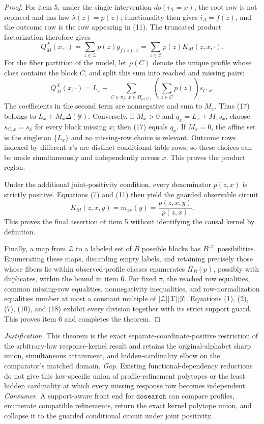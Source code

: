 \documentclass{article}
\begin{document}
\begin{proof}
For item 5, under the single intervention \(do(i_X=x)\), the root row is
not replaced and has law \(\lambda(z)=p(z)\); functionality then gives
\(i_A=f(z)\), and the outcome row is the row appearing in (11).  The
truncated product factorization therefore gives
\[
 Q_M^X(x,\cdot)
 =\sum_{z\in\mathcal Z}p(z)g_{f(z),x}
 =\sum_{z\in\mathcal Z}p(z)K_M(z,x,\cdot).
 \tag{16}
\]
For the fiber partition of the model, let \(\rho(C)\) denote the unique
profile whose class contains the block \(C\), and split this sum into
reached and missing pairs:
\[
 Q_M^X(x,\cdot)
 =L_x+
 \sum_{C\in\pi_f:\,x\in H_{\rho(C)}}
 \left(\sum_{z\in C}p(z)\right)s_{C,x}.
 \tag{17}
\]
The coefficients in the second term are nonnegative and sum to \(M_x\).
Thus (17) belongs to \(L_x+M_x\Delta(\mathcal Y)\).  Conversely, if
\(M_x>0\) and \(q_x=L_x+M_xs_x\), choose
\(s_{C,x}=s_x\) for every block missing \(x\); then (17) equals
\(q_x\).  If \(M_x=0\), the affine set is the singleton \(\{L_x\}\)
and no missing-row choice is relevant.  Outcome rows indexed by different
\(x\)'s are distinct conditional-table rows, so these choices can be made
simultaneously and independently across \(x\).  This proves the product
region.

Under the additional joint-positivity condition, every denominator
\(p(z,x)\) is strictly positive.  Equations (7) and (11) then yield the
guarded observable circuit
\[
 K_M(z,x,y)=m_{zx}(y)=\frac{p(z,x,y)}{p(z,x)}.
 \tag{18}
\]
This proves the final assertion of item 5 without identifying the causal
kernel by definition.

Finally, a map from \(\mathcal Z\) to a labeled set of \(B\) possible
blocks has \(B^{|\mathcal Z|}\) possibilities.  Enumerating these maps,
discarding empty labels, and retaining precisely those whose fibers lie
within observed-profile classes enumerates \(\Pi_B(p)\), possibly with
duplicates, within the bound in item 6.  For fixed \(\pi\), the reached
row equalities, common missing-row equalities, nonnegativity inequalities,
and row-normalization equalities number at most a constant multiple of
\(|\mathcal Z||\mathcal X||\mathcal Y|\).  Equations (1), (2), (7),
(10), and (18) exhibit every division together with its strict support
guard.  This proves item 6 and completes the theorem.
\end{proof}
\par\smallskip\noindent \textit{Justification.} This theorem is the exact separate-coordinate-positive restriction of the arbitrary-law response-kernel result and retains the original-alphabet sharp union, simultaneous attainment, and hidden-cardinality elbow on the comparator's matched domain. \textit{Gap.} Existing functional-dependency reductions do not give this law-specific union of profile-refinement polytopes or the least hidden cardinality at which every missing response row becomes independent. \textit{Consumer.} A support-aware front end for \(\texttt{dosearch}\) can compare profiles, enumerate compatible refinements, return the exact kernel polytope union, and collapse it to the guarded conditional circuit under joint positivity.
\end{document}
